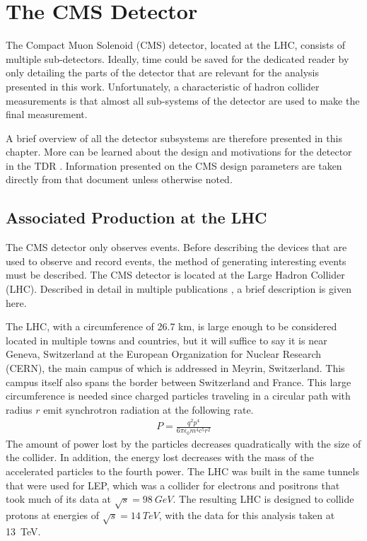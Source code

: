 \chapter{The CMS Detector} \label{ch:detector}

The Compact Muon Solenoid (CMS) detector, located at the LHC,
consists of multiple sub-detectors.
Ideally, time could be saved for the dedicated reader by only detailing
the parts of the detector that are relevant for the analysis presented in this work.
Unfortunately, a characteristic of hadron collider measurements is that
almost all sub-systems of the detector are used to make the final measurement.

A brief overview of all the detector subsystems are therefore presented in this chapter.
More can be learned about the design and motivations for the detector in the TDR \cite{cms-tdr}.
Information presented on the CMS design parameters are taken directly from that document
unless otherwise noted.

\section{Associated Production at the LHC}

The CMS detector only observes events.
Before describing the devices that are used to observe and record events,
the method of generating interesting events must be described.
The CMS detector is located at the Large Hadron Collider (LHC).
Described in detail in multiple publications \cite{Evans_2008},
a brief description is given here.

The LHC, with a circumference of 26.7 km,
is large enough to be considered located in multiple towns and countries,
but it will suffice to say it is near Geneva, Switzerland
at the European Organization for Nuclear Research (CERN),
the main campus of which is addressed in Meyrin, Switzerland.
This campus itself also spans the border between Switzerland and France.
This large circumference is needed since charged particles traveling
in a circular path with radius $r$ emit synchrotron radiation at the following rate.
\begin{gather}
  P = \frac{q^2 p^4}{6\pi \epsilon_0 m^4 c^5 r^2}
\end{gather}
The amount of power lost by the particles decreases quadratically
with the size of the collider.
In addition, the energy lost decreases with the mass of the accelerated particles
to the fourth power.
The LHC was built in the same tunnels that were used for LEP,
which was a collider for electrons and positrons that took much of its data at
$\sqrt{s} = \SI{98}{GeV}$.
The resulting LHC is designed to collide protons at energies of $\sqrt{s} = \SI{14}{TeV}$,
with the data for this analysis taken at \SI{13}{TeV}.

